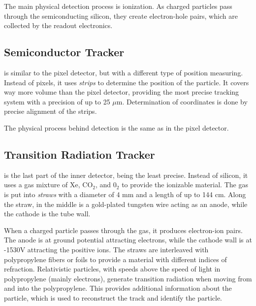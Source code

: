 The main physical detection process is ionization.
As charged particles pass through the semiconducting silicon, they create electron-hole pairs, which are collected by the readout electronics.

\subsection{Semiconductor Tracker}
\SCT is similar to the pixel detector, but with a different type of position measuring.
Instead of pixels, it uses  \emph{strips} to determine the position of the particle.
It covers way more volume than the pixel detector, providing the most precise tracking system with a precision of up to 25 $\mu$m.
Determination of coordinates is done by precise alignment of the strips.

The physical process behind detection is the same as in the pixel detector.

\subsection{Transition Radiation Tracker}
\TRT is the last part of the inner detector, being the least precise.
Instead of silicon, it uses a gas mixture of Xe, CO$_2$, and 0$_2$ to provide the ionizable material.
The gas is put into \emph{straws} with a diameter of 4 mm and a length of up to 144 cm.
Along the straw, in the middle is a gold-plated tungsten wire acting as an anode, while the cathode is the tube wall.

When a charged particle passes through the gas, it produces electron-ion pairs.
The anode is at ground potential attracting electrons, while the cathode wall is at -1530V attracting the positive ions.
The straws are interleaved with polypropylene fibers or foils to provide a material with different indices of refraction.
Relativistic particles, with speeds above the speed of light in polypropylene (mainly electrons), generate transition radiation when moving from and into the polypropylene. 
This provides additional information about the particle, which is used to reconstruct the track and identify the particle. 



